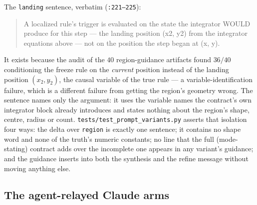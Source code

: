 The \texttt{landing} sentence, verbatim (\texttt{:221--225}):

\begin{quote}
A localized rule's trigger is evaluated on the state the integrator WOULD produce
for this step --- the landing position (x2, y2) from the integrator equations
above --- not on the position the step began at (x, y).
\end{quote}

It exists because the audit of the $40$ region-guidance artifacts found $36/40$
conditioning the freeze rule on the \emph{current} position instead of the
landing position $(x_2, y_2)$, the causal variable of the true rule --- a
variable-identification failure, which is a different failure from getting the
region's geometry wrong. The sentence names only the argument: it uses the
variable names the contract's own integrator block already introduces and states
nothing about the region's shape, centre, radius or count.
\texttt{tests/\allowbreak test\_\allowbreak prompt\_\allowbreak variants.\allowbreak py} asserts that isolation four ways: the
delta over \texttt{region} is exactly one sentence; it contains no shape word and
none of the truth's numeric constants; no line that the full (mode-stating)
contract adds over the incomplete one appears in any variant's guidance; and the
guidance inserts into both the synthesis and the refine message without moving
anything else.

\subsection{The agent-relayed Claude arms}
\label{app:proto-relay}

